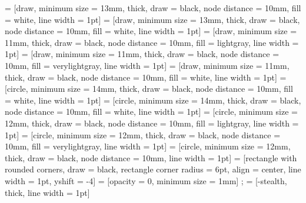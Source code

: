 \documentclass[12pt]{article}
\begin{document}
\setlength{\parindent}{-4cm}


 = [draw,  minimum size = 13mm, thick, draw = black, node distance = 10mm, fill  = white, line width = 1pt]
 = [draw,  minimum size = 13mm, thick, draw = black, node distance = 10mm, fill  = white, line width = 1pt]
 = [draw,  minimum size = 11mm, thick, draw = black, node distance = 10mm, fill  = lightgray, line width = 1pt]
 = [draw,  minimum size = 11mm, thick, draw = black, node distance = 10mm, fill  = verylightgray, line width = 1pt]
 = [draw,  minimum size = 11mm, thick, draw = black, node distance = 10mm, fill  = white, line width = 1pt]
 = [circle,  minimum size = 14mm, thick, draw = black, node distance = 10mm, fill  = white, line width = 1pt]
 = [circle,  minimum size = 14mm, thick, draw = black, node distance = 10mm, fill  = white, line width = 1pt]
 = [circle, minimum size = 12mm, thick, draw = black, node distance = 10mm, fill = lightgray, line width = 1pt]
 = [circle, minimum size = 12mm, thick, draw = black, node distance = 10mm, fill = verylightgray, line width = 1pt]
 = [circle, minimum size = 12mm, thick, draw = black, node distance = 10mm, line width = 1pt]
 = [rectangle with rounded corners, draw = black, rectangle corner radius = 6pt, align = center, line width = 1pt, yshift = -4]
 = [opacity = 0, minimum size = 1mm] {};
 = [-stealth, thick, line width = 1pt]

\pagestyle{empty}

  
\end{document}
